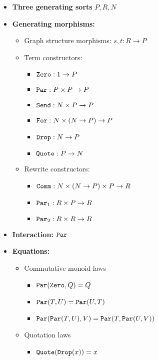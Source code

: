 \documentclass{article}
\begin{document}
\begin{itemize}
    \item \textbf{Three generating sorts} $P, R, N$
    \item \textbf{Generating morphisms:}
    \begin{itemize}
        \item Graph structure morphisms: $s, t : R \to P$
        \item Term constructors: 
        \begin{itemize}
            \item ${\tt Zero} : 1 \to P$
            \item ${\tt Par} : P \times P \to P$
            \item ${\tt Send} : N \times P \to P$
            \item ${\tt For} : N \times (N \to P) \to P$
            \item ${\tt Drop} : N \to P$
            \item ${\tt Quote} : P \to N$
        \end{itemize}
        \item Rewrite constructors:
        \begin{itemize}
            \item ${\tt Comm} : N \times (N \to P) \times P \to R$
            \item ${\tt Par}_1 : R \times P \to R$
            \item ${\tt Par}_2 : R \times R \to R$
        \end{itemize}
    \end{itemize}
    \item \textbf{Interaction:} ${\tt Par}$
    \item \textbf{Equations:}
    \begin{itemize}
        \item Commutative monoid laws
            \begin{itemize}
                \item ${\tt Par}({\tt Zero}, Q) = Q$
                \item ${\tt Par}(T, U) = {\tt Par}(U, T)$
                \item ${\tt Par}({\tt Par}(T, U), V) = {\tt Par}(T, {\tt Par}(U, V))$
            \end{itemize}
        \item Quotation laws
            \begin{itemize}
                \item ${\tt Quote}({\tt Drop}(x)) = x$

\end{itemize}
\end{itemize}
\end{itemize}
\end{document}
